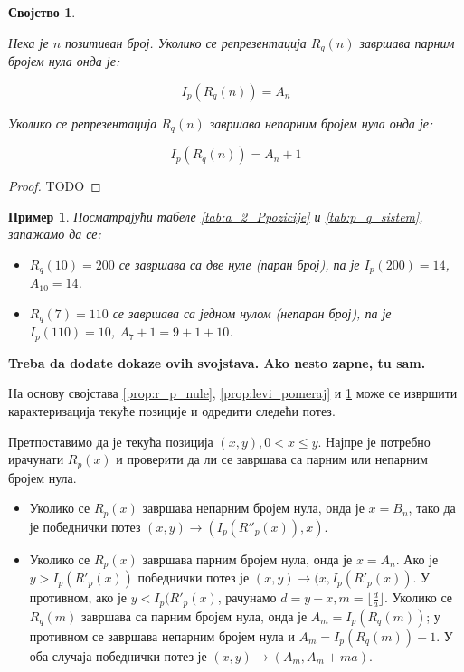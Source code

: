 \documentclass[a4paper]{article}
\newtheorem{example}{Пример}
\newtheorem{property}{Својство}
\begin{document}
\begin{property}
	\label{prop:r_q_nule}
	
	Нека је $ n $ позитиван број. Уколико се репрезентација $ R_q(n) $ завршава парним бројем нула онда је:

	\begin{displaymath}
		I_{p}(R_q(n)) = A_{n}
	\end{displaymath}

	Уколико се репрезентација $ R_q(n) $ завршава непарним бројем нула онда је: 
	
	\begin{displaymath}
		I_{p}(R_q(n)) = A_{n} + 1
	\end{displaymath}

\end{property}

\begin{proof}
	TODO
\end{proof}

\begin{example}
	Посматрајући табеле \ref{tab:a_2_Ppozicije} и \ref{tab:p_q_sistem}, запажамо да се:
	\begin{itemize}
		\item $ R_q(10) = 200 $ се завршава са две нуле (паран број), па је $ I_{p}(200) = 14 $, $ A_{10} = 14 $.
		\item $ R_q(7) = 110 $ се завршава са једном нулом (непаран број), па је $ I_{p}(110) = 10 $, $ A_{7} + 1 = 9 + 1 + 10  $.
	\end{itemize}
\end{example}

\textbf{Treba da dodate dokaze ovih svojstava. Ako nesto zapne, tu sam.}

На основу својстава \ref{prop:r_p_nule}, \ref{prop:levi_pomeraj} и \ref{prop:r_q_nule} може се извршити карактеризација текуће позиције и одредити следећи потез.

Претпоставимо да је текућа позиција $ (x, y), 0 < x \le y $. Најпре је потребно ирачунати $ R_{p}(x) $ и проверити да ли се завршава са парним или непарним бројем нула.

\begin{itemize}
	\item Уколико се $ R_{p}(x) $ завршава непарним бројем нула, онда је $ x = B_{n} $, тако да је победнички потез $ (x, y) \rightarrow (I_{p}(R''_{p}(x)), x) $.
	\item Уколико се $ R_{p}(x) $ завршава парним бројем нула, онда је $ x = A_{n} $. Ако је $ y > I_{p}(R'_{p}(x)) $ победнички потез је $ (x, y) \rightarrow (x, I_{p}(R'_{p}(x)) $. У противном, ако је $ y < I_{p}(R'_{p}(x) $, рачунамо $ d = y - x, m = \lfloor \frac{d}{a} \rfloor $. Уколико се $ R_{q}(m) $ завршава са парним бројем нула, онда је $ A_{m} = I_{p}(R_{q}(m)) $; у противном се завршава непарним бројем нула и $ A_{m} = I_{p}(R_{q}(m)) - 1 $. У оба случаја победнички потез је $ (x, y) \rightarrow (A_{m}, A_{m} + ma) $.
\end{itemize}
\end{document}
